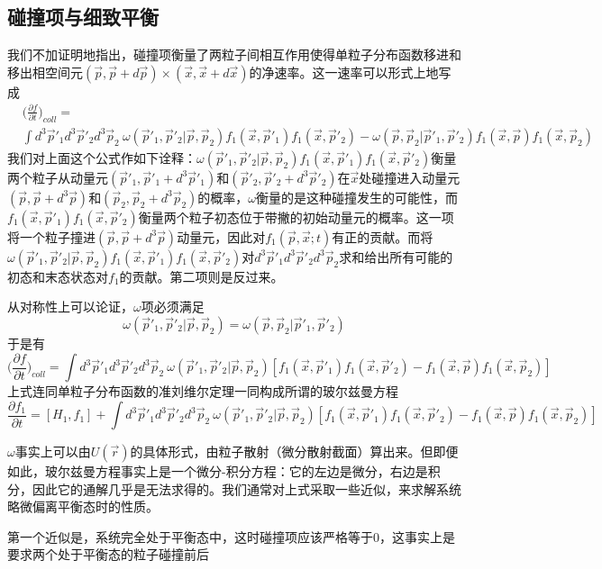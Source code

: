 \documentclass[a4paper,11pt]{ctexart}
\newcommand{\beq}{\begin{equation}}
\newcommand{\eeq}{\end{equation}}
\newcommand{\bea}{\begin{equation}\begin{aligned}}
\newcommand{\eea}{\end{aligned}\end{equation}}
\newcommand{\pfrac}[2]{\frac{\partial #1}{\partial #2}}
\begin{document}
\subsection{碰撞项与细致平衡}
我们不加证明地指出，碰撞项衡量了两粒子间相互作用使得单粒子分布函数移进和移出相空间元$(\vec{p},\vec{p} + d\vec{p})\times (\vec{x},\vec{x}+d\vec{x})$的净速率。这一速率可以形式上地写成
\bea
&\bigg(\pfrac{f}{t}\bigg)_{coll} = \\ &\int d^3 \vec{p}'_1 d^3 \vec{p}'_2 d^3 \vec{p}_2 \ \omega(\vec{p}'_1,\vec{p}'_2|\vec{p},\vec{p}_2)f_1(\vec{x},\vec{p}'_1)f_1(\vec{x},\vec{p}'_2) - \omega(\vec{p},\vec{p}_2|\vec{p}'_1,\vec{p}'_2)f_1(\vec{x},\vec{p})f_1(\vec{x},\vec{p}_2)
\eea
我们对上面这个公式作如下诠释：$\omega(\vec{p}'_1,\vec{p}'_2|\vec{p},\vec{p}_2)f_1(\vec{x},\vec{p}'_1)f_1(\vec{x},\vec{p}'_2)$衡量两个粒子从动量元$(\vec{p}'_1,\vec{p}'_1 + d^3\vec{p}'_1)$和$(\vec{p}'_2,\vec{p}'_2 + d^3\vec{p}'_2)$在$\vec{x}$处碰撞进入动量元$(\vec{p},\vec{p} + d^3\vec{p})$和$(\vec{p}_2,\vec{p}_2 + d^3\vec{p}_2)$的概率，$\omega$衡量的是这种碰撞发生的可能性，而$f_1(\vec{x},\vec{p}'_1)f_1(\vec{x},\vec{p}'_2)$衡量两个粒子初态位于带撇的初始动量元的概率。这一项将一个粒子撞进$(\vec{p},\vec{p} + d^3\vec{p})$动量元，因此对$f_1(\vec{p},\vec{x};t)$有正的贡献。而将$\omega(\vec{p}'_1,\vec{p}'_2|\vec{p},\vec{p}_2)f_1(\vec{x},\vec{p}'_1)f_1(\vec{x},\vec{p}'_2)$对$d^3 \vec{p}'_1 d^3 \vec{p}'_2 d^3 \vec{p}_2$求和给出所有可能的初态和末态状态对$f_1$的贡献。第二项则是反过来。
\par
从对称性上可以论证，$\omega$项必须满足
\beq
\omega(\vec{p}'_1,\vec{p}'_2|\vec{p},\vec{p}_2) = \omega(\vec{p},\vec{p}_2|\vec{p}'_1,\vec{p}'_2)
\eeq
于是有
\beq
\bigg(\pfrac{f}{t}\bigg)_{coll} = \int d^3 \vec{p}'_1 d^3 \vec{p}'_2 d^3 \vec{p}_2\ \omega(\vec{p}'_1,\vec{p}'_2|\vec{p},\vec{p}_2)[f_1(\vec{x},\vec{p}'_1)f_1(\vec{x},\vec{p}'_2) - f_1(\vec{x},\vec{p})f_1(\vec{x},\vec{p}_2)]
\eeq
上式连同单粒子分布函数的准刘维尔定理一同构成所谓的玻尔兹曼方程
\beq
\pfrac{f_1}{t} = [H_1,f_1] + \int d^3 \vec{p}'_1 d^3 \vec{p}'_2 d^3 \vec{p}_2\ \omega(\vec{p}'_1,\vec{p}'_2|\vec{p},\vec{p}_2)[f_1(\vec{x},\vec{p}'_1)f_1(\vec{x},\vec{p}'_2) - f_1(\vec{x},\vec{p})f_1(\vec{x},\vec{p}_2)]
\eeq
\par
$\omega$事实上可以由$U(\vec{r})$的具体形式，由粒子散射（微分散射截面）算出来。但即便如此，玻尔兹曼方程事实上是一个微分-积分方程：它的左边是微分，右边是积分，因此它的通解几乎是无法求得的。我们通常对上式采取一些近似，来求解系统略微偏离平衡态时的性质。
\par
第一个近似是，系统完全处于平衡态中，这时碰撞项应该严格等于0，这事实上是要求两个处于平衡态的粒子碰撞前后
\end{document}
